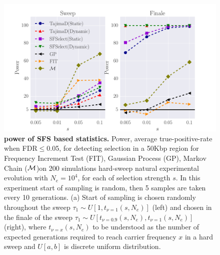 \documentclass[11pt]{article}
\begin{document}
\begin{figure}[H]
	\centering
	\includegraphics[trim=.4in 0 .8in 0.6in , clip,width=\textwidth]{figures/naturalee.pdf}
	\caption{{\bf power of SFS based statistics.} Power, average
          true-positive-rate when FDR$\le$0.05, for detecting
          selection in a 50Kbp region for Frequency Increment Test
          (FIT), Gaussian Process (GP), Markov Chain (${\cal M}$)on 200
          simulations hard-sweep natural experimental evolution with
          $N_e=10^4$, for each of selection strength $s$. In this
          experiment start of sampling is random, then 5 samples are
          taken every 10 generations. (a) Start of sampling is chosen
          randomly throughout the sweep $\tau_1 \sim
          U\left[1,t_{\nu=1}(s,N_e)\right]$ (left) and chosen in the
          finale of the sweep $\tau_1 \sim
          U\left[t_{\nu=0.9}(s,N_e),t_{\nu=1}(s,N_e)\right]$ (right),
          where $t_{\nu=x}(s,N_e)$ to be understood as the number of
          expected generations required to reach carrier frequency $x$
          in a hard sweep and $U[a,b]$ is discrete uniform
          distribution.} \label{fig:powerSFS}
\end{figure}
\end{document}
